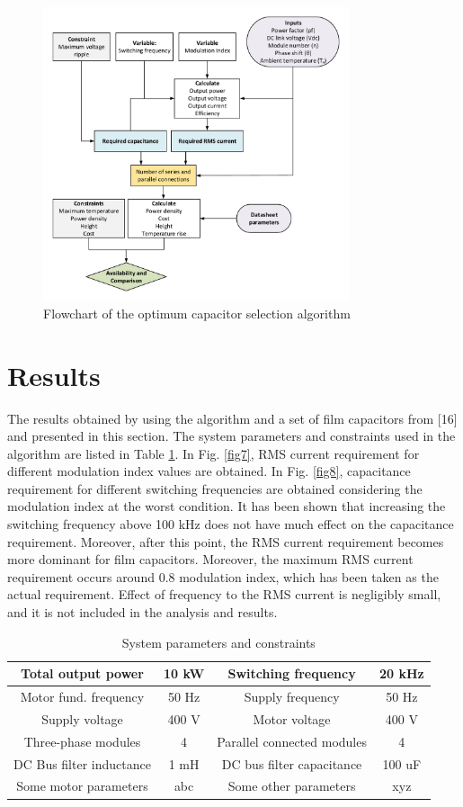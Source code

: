 \documentclass[conference,a4paper,twocolumn]{IEEEtran}
\begin{document}
\begin{figure}[h]
  \centering
  \includegraphics[width=9cm]{fig6}
  \caption{Flowchart of the optimum capacitor selection algorithm}
  \label{fig6}
\end{figure}



\section{Results}

The results obtained by using the algorithm and a set of film capacitors from [16] and presented in this section. The system parameters and constraints used in the algorithm are listed in Table \ref{table2}. In Fig. \ref{fig7}, RMS current requirement for different modulation index values are obtained. In Fig. \ref{fig8}, capacitance requirement for different switching frequencies are obtained considering the modulation index at the worst condition. It has been shown that increasing the switching frequency above 100 kHz does not have much effect on the capacitance requirement. Moreover, after this point, the RMS current requirement becomes more dominant for film capacitors. Moreover, the maximum RMS current requirement occurs around 0.8 modulation index, which has been taken as the actual requirement. Effect of frequency to the RMS current is negligibly small, and it is not included in the analysis and results.



\begin{table}[h]
\renewcommand{\arraystretch}{1.4}
\caption{System parameters and constraints}
\label{table2}
\centering
\begin{tabular}{|c|c|c|c|}
\hline
Total output power & 10 kW & Switching frequency & 20 kHz\\
\hline
Motor fund. frequency & 50 Hz & Supply frequency & 50 Hz\\
\hline
Supply voltage & 400 V & Motor voltage & 400 V\\
\hline
Three-phase modules & 4 & Parallel connected modules & 4\\
\hline
DC Bus filter inductance & 1 mH & DC bus filter capacitance & 100 uF\\
\hline
Some motor parameters & abc & Some other parameters & xyz\\
\hline
\end{tabular}
\end{table}
\end{document}
